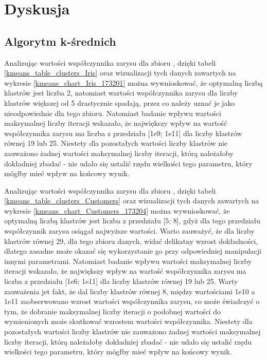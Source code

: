 \documentclass{classrep}
\begin{document}
    \section{Dyskusja}
    \label{summary} {

        \subsection{Algorytm k-średnich}
        \label{summary_1} {
            Analizując wartości współczynnika zarysu dla zbioru \cite{dataset_iris},
            dzięki tabeli \ref{kmeans_table_clusters_Iris} oraz wizualizacji tych
            danych zawartych na wykresie \ref{kmeans_chart_Iris_173201} można
            wywnioskować, że optymalną liczbą klastrów jest liczba 2, natomiast
            wartości współczynnika zarysu dla liczby klastrów większej od 5 drastycznie
            spadają, przez co należy uznać je jako nieodpowiednie dla tego zbioru.
            Natomiast badanie wpływu wartości maksymalnej liczby iteracji wskazało, że
            największy wpływ na wartość współczynnika zarysu ma liczba z przedziału
            [1e9; 1e11] dla liczby klastrów równej 19 lub 25. Niestety dla pozostałych
            wartości liczby klastrów nie zauważono żadnej wartości maksymalnej liczby
            iteracji, którą należałoby dokładniej zbadać - nie udało się ustalić rzędu
            wielkości tego parametru, który mógłby mieć wpływ na końcowy wynik.

            Analizując wartości współczynnika zarysu dla zbioru
            \cite{dataset_customers}, dzięki tabeli
            \ref{kmeans_table_clusters_Customers} oraz wizualizacji tych danych
            zawartych na wykresie \ref{kmeans_chart_Customers_173204} można
            wywnioskować, że optymalną liczbą klastrów jest liczba z przedziału [5; 8],
            gdyż dla tego przedziału współczynnik zarysu osiągał najwyższe wartości.
            Warto zauważyć, że dla liczby klastrów równej 29, dla tego zbioru danych,
            widać delikatny wzrost dokładności, dlatego zasadne może okazać się
            wykorzystanie go przy odpowiedniej manipulacji innymi parametrami.
            Natomiast badanie wpływu wartości maksymalnej liczby iteracji wskazało, że
            największy wpływ na wartość współczynnika zarysu ma liczba z przedziału
            [1e6; 1e11] dla liczby klastrów równej 19 lub 25. Warty zauważenia jet
            fakt, że dal liczby klastrów równej 8, między wartościami 1e10 a 1e11
            zaobserwowano wzrost wartości współczynnika zarysu, co może świadczyć o
            tym, że dobranie maksymalnej liczby iteracji o podobnej wartości do
            wymienionych może skutkować wzrostem wartości współczynnika. Niestety dla
            pozostałych wartości liczby klastrów nie zauważono żadnej wartości
            maksymalnej liczby iteracji, którą należałoby dokładniej zbadać - nie udało
            się ustalić rzędu wielkości tego parametru, który mógłby mieć wpływ na
            końcowy wynik.

}}
\end{document}
